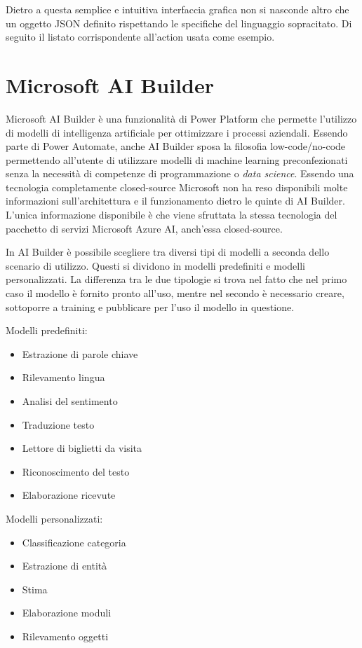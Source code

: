 Dietro a questa semplice e intuitiva interfaccia grafica non si nasconde altro che un oggetto JSON definito rispettando le specifiche del linguaggio sopracitato. Di seguito il listato corrispondente all'action usata come esempio.



 \section{Microsoft AI Builder}
Microsoft AI Builder è una funzionalità di Power Platform che permette l'utilizzo di modelli di intelligenza artificiale per ottimizzare i processi aziendali. Essendo parte di Power Automate, anche AI Builder sposa la filosofia low-code/no-code permettendo all'utente di utilizzare modelli di machine learning preconfezionati senza la necessità di competenze di programmazione o \textit{data science}.
Essendo una tecnologia completamente closed-source Microsoft non ha reso disponibili molte informazioni sull'architettura e il funzionamento dietro le quinte di AI Builder. L'unica informazione disponibile è che viene sfruttata la stessa tecnologia del pacchetto di servizi Microsoft Azure AI, anch'essa closed-source.

In AI Builder è possibile scegliere tra diversi tipi di modelli a seconda dello scenario di utilizzo. Questi si dividono in modelli predefiniti e modelli personalizzati.
La differenza tra le due tipologie si trova nel fatto che nel primo caso il modello è fornito pronto all'uso, mentre nel secondo è necessario creare, sottoporre a training e pubblicare per l'uso il modello in questione.

\begin{multicols}{2}
  Modelli predefiniti:
    \begin{itemize}
      \item Estrazione di parole chiave
      \item Rilevamento lingua
      \item Analisi del sentimento
      \item Traduzione testo
      \item Lettore di biglietti da visita
      \item Riconoscimento del testo
      \item Elaborazione ricevute
    \end{itemize}
\columnbreak
  Modelli personalizzati:
    \begin{itemize}
      \item Classificazione categoria
      \item Estrazione di entità
      \item Stima
      \item Elaborazione moduli
      \item Rilevamento oggetti
    \end{itemize}
\end{multicols}

